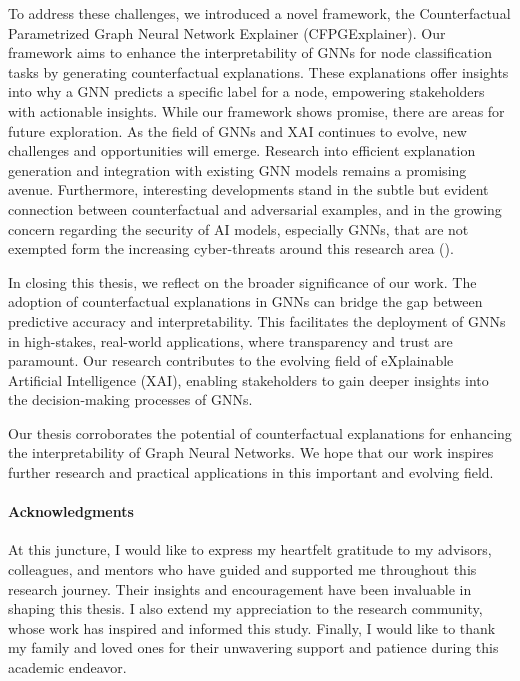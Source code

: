 \documentclass[binding=0.6cm]{sapthesis}
\newcommand{\mycite}[1]{(\cite{#1})}
\begin{document}
To address these challenges, we introduced a novel framework, the Counterfactual Parametrized Graph Neural Network Explainer (CFPGExplainer). Our framework aims to enhance the interpretability of GNNs for node classification tasks by generating counterfactual explanations. These explanations offer insights into why a GNN predicts a specific label for a node, empowering stakeholders with actionable insights. While our framework shows promise, there are areas for future exploration. As the field of GNNs and XAI continues to evolve, new challenges and opportunities will emerge. Research into efficient explanation generation and integration with existing GNN models remains a promising avenue. Furthermore, interesting developments stand in the subtle but evident connection between counterfactual and adversarial examples, and in the growing concern regarding the security of AI models, especially GNNs, that are not exempted form the increasing cyber-threats around this research area \mycite{sun2023-attack-defense}. 
 
In closing this thesis, we reflect on the broader significance of our work. The adoption of counterfactual explanations in GNNs can bridge the gap between predictive accuracy and interpretability. This facilitates the deployment of GNNs in high-stakes, real-world applications, where transparency and trust are paramount. Our research contributes to the evolving field of eXplainable Artificial Intelligence (XAI), enabling stakeholders to gain deeper insights into the decision-making processes of GNNs.

Our thesis corroborates the potential of counterfactual explanations for enhancing the interpretability of Graph Neural Networks. We hope that our work inspires further research and practical applications in this important and evolving field.


\paragraph{Acknowledgments}
At this juncture, I would like to express my heartfelt gratitude to my advisors, colleagues, and mentors who have guided and supported me throughout this research journey. Their insights and encouragement have been invaluable in shaping this thesis. I also extend my appreciation to the research community, whose work has inspired and informed this study. Finally, I would like to thank my family and loved ones for their unwavering support and patience during this academic endeavor.


\backmatter
\cleardoublepage %

\printbibheading
\printbibliography[type=article,heading=subbibliography,title={Articles}]
\printbibliography[type=inbook,heading=subbibliography,title={Inproceedings}]
\printbibliography[type=book,heading=subbibliography,title={Books}]
\printbibliography[type=misc,heading=subbibliography,title={Miscellaneous}]
\end{document}
